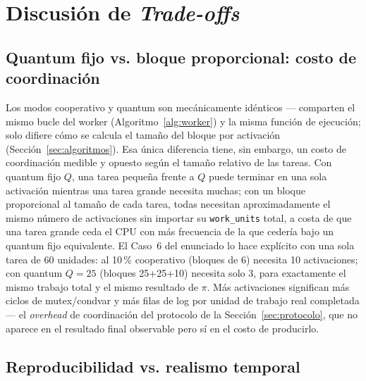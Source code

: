 \section{Discusión de \textit{Trade-offs}}
\label{sec:tradeoffs}

\subsection{Quantum fijo vs. bloque proporcional: costo de coordinación}

Los modos cooperativo y quantum son mecánicamente idénticos --- comparten
el mismo bucle del worker (Algoritmo~\ref{alg:worker}) y la misma función de
ejecución; solo difiere cómo se calcula el tamaño del bloque por activación
(Sección~\ref{sec:algoritmos}). Esa única diferencia tiene, sin embargo, un
costo de coordinación medible y opuesto según el tamaño relativo de las
tareas. Con quantum fijo $Q$, una tarea pequeña frente a $Q$ puede terminar
en una sola activación mientras una tarea grande necesita muchas; con un
bloque proporcional al tamaño de cada tarea, todas necesitan
aproximadamente el mismo número de activaciones sin importar su
\texttt{work\_units} total, a costa de que una tarea grande ceda el CPU con
más frecuencia de la que cedería bajo un quantum fijo equivalente. El Caso~6
del enunciado lo hace explícito con una sola tarea de 60 unidades: al 10\,\%
cooperativo (bloques de 6) necesita 10 activaciones; con quantum $Q=25$
(bloques 25+25+10) necesita solo 3, para exactamente el mismo trabajo total
y el mismo resultado de $\pi$. Más activaciones significan más ciclos de
mutex/condvar y más filas de log por unidad de trabajo real completada ---
el \textit{overhead} de coordinación del protocolo de la
Sección~\ref{sec:protocolo}, que no aparece en el resultado final observable
pero sí en el costo de producirlo.

\subsection{Reproducibilidad vs. realismo temporal}

